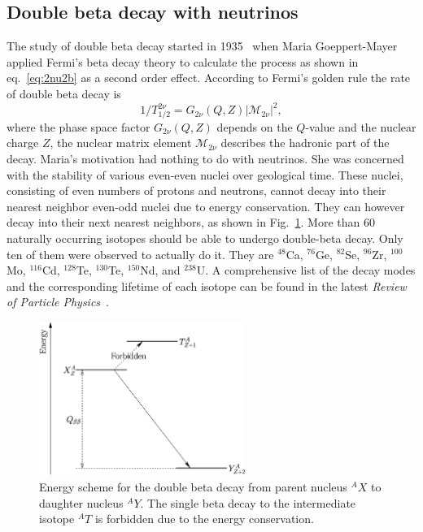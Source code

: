 \subsection{Double beta decay with neutrinos}
\label{sec:2n2b}
The study of double beta decay started in 1935~\cite{Goe35} when Maria
Goeppert-Mayer applied Fermi's beta decay theory to calculate the
process as shown in eq.~\ref{eq:2nu2b} as a second order effect. According to Fermi's golden rule the rate of double beta decay is 
\begin{equation}
  \label{eq:2nurate}
  1/T^{2\nu}_{1/2} = G_{2\nu}(Q,Z) |\mathcal{M}_{2\nu}|^{2},
\end{equation}
where the phase space factor $G_{2\nu}(Q,Z)$ depends on the $Q$-value and the nuclear charge $Z$, the nuclear matrix element $\mathcal{M}_{2\nu}$ describes the hadronic part of the decay. Maria's motivation had nothing to do with neutrinos. She was concerned with the stability of various even-even nuclei over geological time. These nuclei, consisting of even numbers of protons and neutrons, cannot decay into their nearest neighbor even-odd nuclei due to energy conservation. They can however decay into their next nearest neighbors, as shown in Fig.~\ref{fig:ee2oo}. More than 60 naturally occurring isotopes should be able to undergo double-beta decay. Only ten of them were observed to actually do it. They are $^{48}$Ca, $^{76}$Ge, $^{82}$Se, $^{96}$Zr, $^{100}$Mo, $^{116}$Cd, $^{128}$Te, $^{130}$Te, $^{150}$Nd, and $^{238}$U. A comprehensive list of the decay modes and the corresponding lifetime of each isotope can be found in the latest \emph{Review of Particle Physics}~\cite{PDG07}.
\begin{figure}[tbhp]
  \centering
  \includegraphics[width=0.6\textwidth]{Espec0nu2b.eps}  
  \caption{Energy scheme for the double beta decay from parent nucleus     $^{A}X$ to daughter nucleus $^{A}Y$. The single beta decay to the     intermediate isotope $^{A}T$ is forbidden due to the energy     conservation.}
  \label{fig:ee2oo}
\end{figure}

